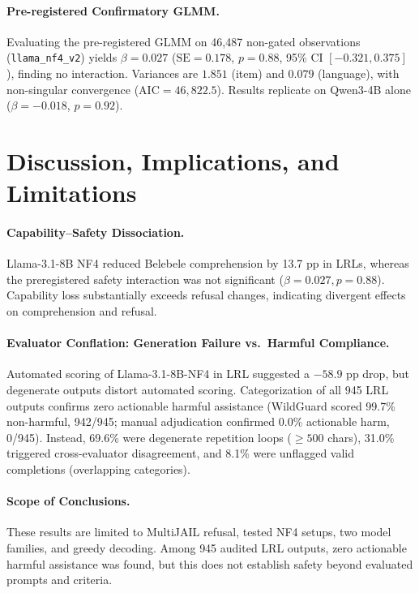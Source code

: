 \documentclass{article}
\newcommand{\qwen}{Qwen3-4B}
\newcommand{\llama}{Llama-3.1-8B}
\begin{document}
\paragraph{Pre-registered Confirmatory GLMM.}
Evaluating the pre-registered GLMM on 46{,}487 non-gated observations (\texttt{llama\_nf4\_v2}) yields $\beta = 0.027$ ($\text{SE} = 0.178$, $p = 0.88$, 95\% CI $[-0.321, 0.375]$), finding no interaction. Variances are $1.851$ (item) and $0.079$ (language), with non-singular convergence ($\text{AIC}=46{,}822.5$). Results replicate on \qwen{} alone ($\beta = -0.018$, $p = 0.92$).

\section{Discussion, Implications, and Limitations}
\label{sec:discussion}

\paragraph{Capability--Safety Dissociation.}
\llama{} NF4 reduced Belebele comprehension by 13.7 pp in LRLs, whereas the preregistered safety interaction was not significant ($\beta = 0.027, p = 0.88$). Capability loss substantially exceeds refusal changes, indicating divergent effects on comprehension and refusal.

\paragraph{Evaluator Conflation: Generation Failure vs.\ Harmful Compliance.}
Automated scoring of \llama{}-NF4 in LRL suggested a $-58.9$ pp drop, but degenerate outputs distort automated scoring. Categorization of all 945 LRL outputs confirms zero actionable harmful assistance (WildGuard scored 99.7\% non-harmful, 942/945; manual adjudication confirmed 0.0\% actionable harm, 0/945). Instead, 69.6\% were degenerate repetition loops ($\ge 500$ chars), 31.0\% triggered cross-evaluator disagreement, and 8.1\% were unflagged valid completions (overlapping categories).

\paragraph{Scope of Conclusions.}
These results are limited to MultiJAIL refusal, tested NF4 setups, two model families, and greedy decoding. Among 945 audited LRL outputs, zero actionable harmful assistance was found, but this does not establish safety beyond evaluated prompts and criteria.
\end{document}
